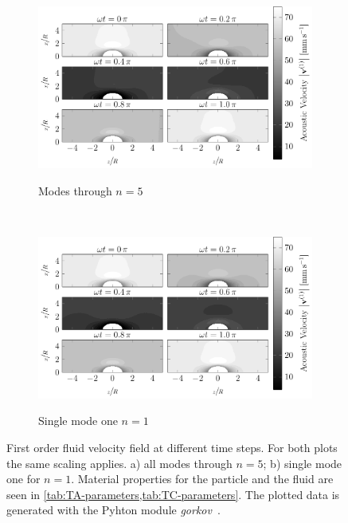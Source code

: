 \begin{figure}
  \centering
  \begin{subfigure}[b]{\textwidth}
    \centering
    \caption{Modes through $n=5$}
    \includegraphics[]{Plots/cache/SC_all.pdf}
    \label{fig:TA-SC_all}
  \end{subfigure}\\%
  \begin{subfigure}[b]{\textwidth}
    \centering
    \caption{Single mode one $n=1$}
    \includegraphics[]{Plots/cache/SC_mode1.pdf}
    \label{fig:TA-SC_mode1}
  \end{subfigure}
  \caption{First order fluid velocity field at different time steps. For both 
  plots the same scaling applies. a) all modes through $n=5$; b) single mode 
one for $n=1$. Material properties for the particle and the fluid are seen in 
\cref{tab:TA-parameters,tab:TC-parameters}. The plotted data is generated with 
the Pyhton module \emph{gorkov}~\cite{FankhauserPython2022}.}
  \label{fig:TA-SC}
\end{figure}

